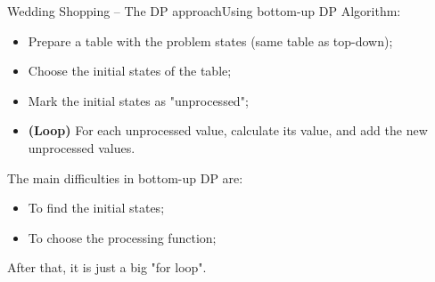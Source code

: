 
\begin{frame}{Wedding Shopping -- The DP approach}{Using bottom-up DP}
  Algorithm:
  \begin{itemize}
  \item Prepare a table with the problem states (same table as top-down);
  \item Choose the initial states of the table;
  \item Mark the initial states as "unprocessed";
  \item {\bf (Loop)} For each unprocessed value, calculate its value, and add the new unprocessed values.
  \end{itemize}

  \vfill

  The main difficulties in bottom-up DP are:
  \begin{itemize}
    \item To find the initial states;
    \item To choose the processing function;
  \end{itemize}
  After that, it is just a big "for loop".
\end{frame}

